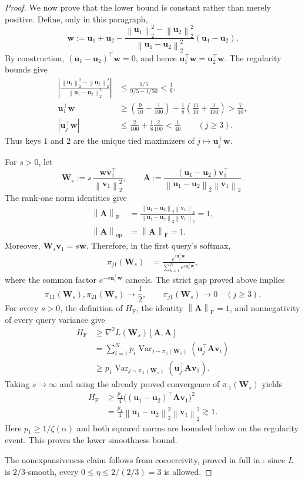 \documentclass[11pt]{article}
\theoremstyle{definition}
\newcommand{\ub}{\mathbf{u}}
\newcommand{\vb}{\mathbf{v}}
\newcommand{\wb}{\mathbf{w}}
\newcommand{\Ab}{\mathbf{A}}
\newcommand{\Wb}{\mathbf{W}}
\newcommand{\norm}[1]{\left\lVert #1\right\rVert_2}
\newcommand{\normF}[1]{\left\lVert #1\right\rVert_{\mathrm F}}
\newcommand{\normop}[1]{\left\lVert #1\right\rVert_{\mathrm{op}}}
\newcommand{\HF}{H_{\mathrm F}}
\begin{document}
\begin{proof}
We now prove that the lower bound is constant rather than merely positive.
Define, only in this paragraph,
\[
 \wb
 :=\ub_1+\ub_2
 -\frac{\norm{\ub_1}^2-\norm{\ub_2}^2}
 {\norm{\ub_1-\ub_2}^2}(\ub_1-\ub_2).
\]
By construction,
$(\ub_1-\ub_2)^\top\wb=0$, and hence
$\ub_1^\top\wb=\ub_2^\top\wb$.  The regularity bounds give
\begin{align*}
 \left|
  \frac{\norm{\ub_1}^2-\norm{\ub_2}^2}
  {\norm{\ub_1-\ub_2}^2}
 \right|
 &\leq\frac{1/5}{9/5-1/50}<\frac18,\\
 \ub_1^\top\wb
 &\geq
 \left(\frac9{10}-\frac1{100}\right)
 -\frac18\left(\frac{11}{10}+\frac1{100}\right)
 >\frac7{10},\\
 |\ub_j^\top\wb|
 &\leq\frac2{100}+\frac18\frac2{100}<\frac1{40}
 \qquad(j\geq3).
\end{align*}
Thus keys $1$ and $2$ are the unique tied maximizers of
$j\mapsto\ub_j^\top\wb$.

For $s>0$, let
\[
 \Wb_s:=s\,\frac{\wb\vb_1^\top}{\norm{\vb_1}^2},
 \qquad
 \Ab:=\frac{(\ub_1-\ub_2)\vb_1^\top}
 {\norm{\ub_1-\ub_2}\norm{\vb_1}}.
\]
The rank-one norm identities give
\begin{align*}
 \normF{\Ab}
 &=\frac{\norm{\ub_1-\ub_2}\norm{\vb_1}}
 {\norm{\ub_1-\ub_2}\norm{\vb_1}}=1,\\
 \normop{\Ab}&=\normF{\Ab}=1.
\end{align*}
Moreover, $\Wb_s\vb_1=s\wb$.  Therefore, in the first query's softmax,
\begin{align*}
 \pi_{j1}(\Wb_s)
 &=\frac{e^{s\ub_j^\top\wb}}
 {\sum_{k=1}^Ne^{s\ub_k^\top\wb}},
\end{align*}
where the common factor $e^{-s\ub_1^\top\wb}$ cancels.  The strict gap
proved above implies
\[
 \pi_{11}(\Wb_s),\pi_{21}(\Wb_s)\longrightarrow\frac12,
 \qquad
 \pi_{j1}(\Wb_s)\longrightarrow0\quad(j\geq3).
\]
For every $s>0$, the definition of $\HF$, the identity
$\normF{\Ab}=1$, and nonnegativity of every query variance give
\begin{align*}
 \HF
 &\geq\nabla^2L(\Wb_s)[\Ab,\Ab]\\
 &=\sum_{i=1}^Np_i
 \operatorname{Var}_{j\sim\pi_{\cdot i}(\Wb_s)}
 (\ub_j^\top\Ab\vb_i)\\
 &\geq p_1
 \operatorname{Var}_{j\sim\pi_{\cdot1}(\Wb_s)}
 (\ub_j^\top\Ab\vb_1).
\end{align*}
Taking $s\to\infty$ and using the already proved convergence of
$\pi_{\cdot1}(\Wb_s)$ yields
\begin{align*}
 \HF
 &\geq\frac{p_1}{4}
 \bigl((\ub_1-\ub_2)^\top\Ab\vb_1\bigr)^2\\
 &=\frac{p_1}{4}\norm{\ub_1-\ub_2}^2\norm{\vb_1}^2
 \gtrsim1.
\end{align*}
Here $p_1\geq1/\zeta(\alpha)$ and both squared norms are bounded below on
the regularity event.  This proves the lower smoothness bound.

The nonexpansiveness claim follows from cocoercivity, proved in full in
: since $L$ is $2/3$-smooth, every
$0\leq\eta\leq2/(2/3)=3$ is allowed.
\end{proof}
\end{document}
